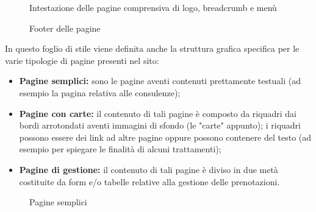 \documentclass[]{article}
\begin{document}
\begin{figure}[H]
	\centering
	\caption{Intestazione delle pagine comprensiva di logo, breadcrumb e menù}
\end{figure}

\begin{figure}[H]
	\centering
	\caption{Footer delle pagine}
\end{figure}

In questo foglio di stile viene definita anche la struttura grafica specifica per le varie tipologie di pagine presenti nel sito:
\begin{itemize}
	\item \textbf{Pagine semplici:} sono le pagine aventi contenuti prettamente testuali (ad esempio la pagina relativa alle consulenze);
	\item \textbf{Pagine con carte:} il contenuto di tali pagine è composto da riquadri dai bordi arrotondati aventi immagini di sfondo (le "carte" appunto); i riquadri possono essere dei link ad altre pagine oppure possono contenere del testo (ad esempio per spiegare le finalità di alcuni trattamenti);
	\item \textbf{Pagine di gestione:} il contenuto di tali pagine è diviso in due metà costituite da form e/o tabelle relative alla gestione delle prenotazioni.
\end{itemize}

\begin{figure}[H]
	\centering
	\caption{Pagine semplici}
\end{figure}
\end{document}
